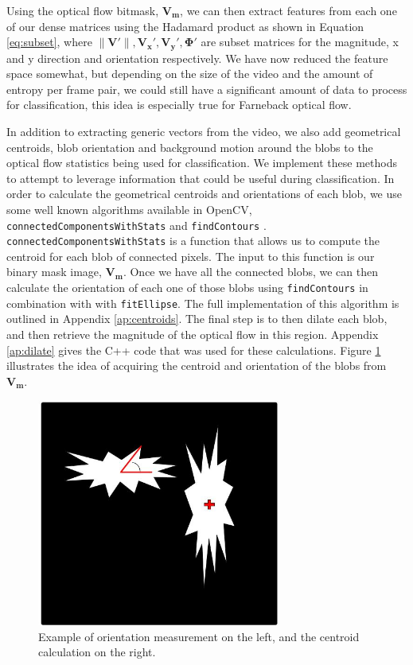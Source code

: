 Using the optical flow bitmask, $\mathbf{V_m}$, we can then extract features
from each one of our dense matrices using the Hadamard product as shown in
Equation \ref{eq:subset}, where $\|\mathbf{V\prime}\|,
\mathbf{V_x\prime},\mathbf{V_y\prime}, \mathbf{\Phi\prime}$ are subset matrices
for the magnitude, x and y direction and orientation respectively. We have now
reduced the feature space somewhat, but depending on the size of the video and the
amount of entropy per frame pair, we could still have a significant amount of
data to process for classification, this idea is especially true for
Farneback optical flow.

In addition to extracting generic vectors from the video, we also add
geometrical centroids, blob orientation and background motion around the blobs
to the optical flow statistics being used for classification. We implement these
methods to attempt to leverage information that could be useful during
classification. In order to calculate the geometrical centroids and orientations
of each blob, we use some well known algorithms available in OpenCV,
\texttt{connectedComponentsWithStats} and \texttt{findContours}
\cite{itseez2015opencv}. \texttt{connectedComponentsWithStats} is a function
that allows us to compute the centroid for each blob of connected pixels. The
input to this function is our binary mask image, $\mathbf{V_m}$. Once we have
all the connected blobs, we can then calculate the orientation of each one of
those blobs using \texttt{findContours} in combination with with
\texttt{fitEllipse}. The full implementation of this algorithm is outlined in
Appendix \ref{ap:centroids}. The final step is to then dilate each blob, and
then retrieve the magnitude of the optical flow in this region. Appendix
\ref{ap:dilate} gives the C++ code that was used for these calculations.
Figure \ref{fig:orient_cent} illustrates the idea of acquiring
the centroid and orientation of the blobs from $\mathbf{V_m}$.

\begin{figure}[h]
  \centering
  \includegraphics[width=8cm]{figures/cent_and_orient}
  \caption{Example of orientation measurement on the left, and the centroid
  calculation on the right.}
  \label{fig:orient_cent}
\end{figure}

